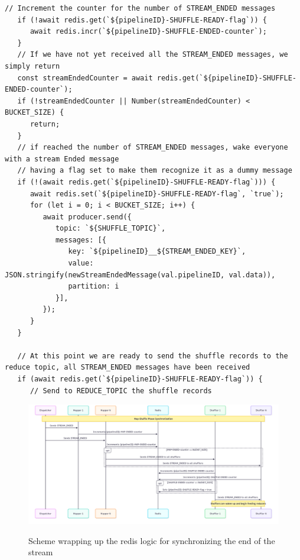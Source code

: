 \begin{lstlisting}[label={lst:streamEndedShuffler}, caption={Handling the STREAM\_ENDED message in a shuffler},captionpos={top}]
   // Increment the counter for the number of STREAM_ENDED messages
   if (!await redis.get(`${pipelineID}-SHUFFLE-READY-flag`)) {
      await redis.incr(`${pipelineID}-SHUFFLE-ENDED-counter`);
   }
   // If we have not yet received all the STREAM_ENDED messages, we simply return
   const streamEndedCounter = await redis.get(`${pipelineID}-SHUFFLE-ENDED-counter`);
   if (!streamEndedCounter || Number(streamEndedCounter) < BUCKET_SIZE) {
      return;
   }
   // if reached the number of STREAM_ENDED messages, wake everyone with a stream Ended message 
   // having a flag set to make them recognize it as a dummy message
   if (!(await redis.get(`${pipelineID}-SHUFFLE-READY-flag`))) {
      await redis.set(`${pipelineID}-SHUFFLE-READY-flag`, `true`);
      for (let i = 0; i < BUCKET_SIZE; i++) {
         await producer.send({
            topic: `${SHUFFLE_TOPIC}`,
            messages: [{
               key: `${pipelineID}__${STREAM_ENDED_KEY}`,
               value: JSON.stringify(newStreamEndedMessage(val.pipelineID, val.data)),
               partition: i
            }],
         });
      }
   }
  
   // At this point we are ready to send the shuffle records to the reduce topic, all STREAM_ENDED messages have been received
   if (await redis.get(`${pipelineID}-SHUFFLE-READY-flag`)) {
      // Send to REDUCE_TOPIC the shuffle records
\end{lstlisting}

\newpage
\begin{figure}[htbp]
   \centering
   \caption{Scheme wrapping up the redis logic for synchronizing the end of the stream}
   \includegraphics[width=\columnwidth]{images/redisSynch.png}
   \label{fig:redisSynch}
\end{figure}


